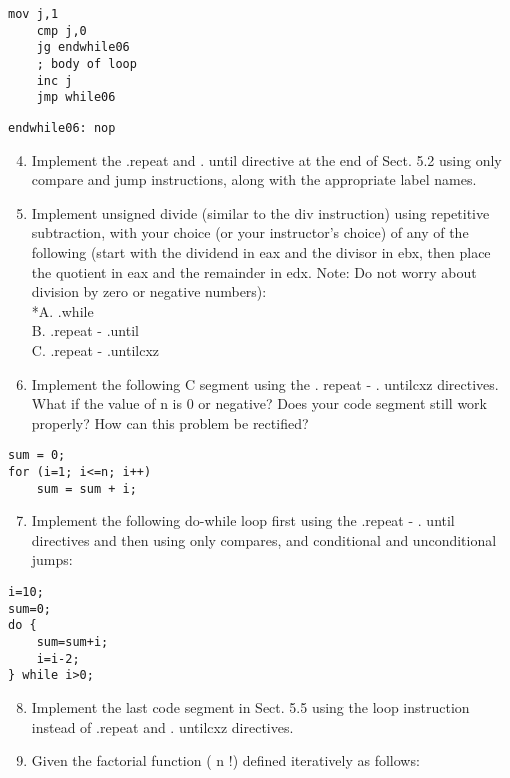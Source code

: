 \documentclass[10pt]{article}
\begin{document}
\begin{verbatim}
mov j,1
    cmp j,0
    jg endwhile06
    ; body of loop
    inc j
    jmp while06
\end{verbatim}

\begin{verbatim}
endwhile06: nop
\end{verbatim}

\begin{enumerate}
  \setcounter{enumi}{3}
  \item Implement the .repeat and . until directive at the end of Sect. 5.2 using only compare and jump instructions, along with the appropriate label names.
  \item Implement unsigned divide (similar to the div instruction) using repetitive subtraction, with your choice (or your instructor's choice) of any of the following (start with the dividend in eax and the divisor in ebx, then place the quotient in eax and the remainder in edx. Note: Do not worry about division by zero or negative numbers):\\
*A. .while\\
B. .repeat - .until\\
C. .repeat - .untilcxz
  \item Implement the following C segment using the . repeat - . untilcxz directives. What if the value of n is 0 or negative? Does your code segment still work properly? How can this problem be rectified?
\end{enumerate}

\begin{verbatim}
sum = 0;
for (i=1; i<=n; i++)
    sum = sum + i;
\end{verbatim}

\begin{enumerate}
  \setcounter{enumi}{6}
  \item Implement the following do-while loop first using the .repeat - . until directives and then using only compares, and conditional and unconditional jumps:
\end{enumerate}

\begin{verbatim}
i=10;
sum=0;
do {
    sum=sum+i;
    i=i-2;
} while i>0;
\end{verbatim}

\begin{enumerate}
  \setcounter{enumi}{7}
  \item Implement the last code segment in Sect. 5.5 using the loop instruction instead of .repeat and . untilcxz directives.
  \item Given the factorial function ( n !) defined iteratively as follows:
\end{enumerate}
\end{document}
